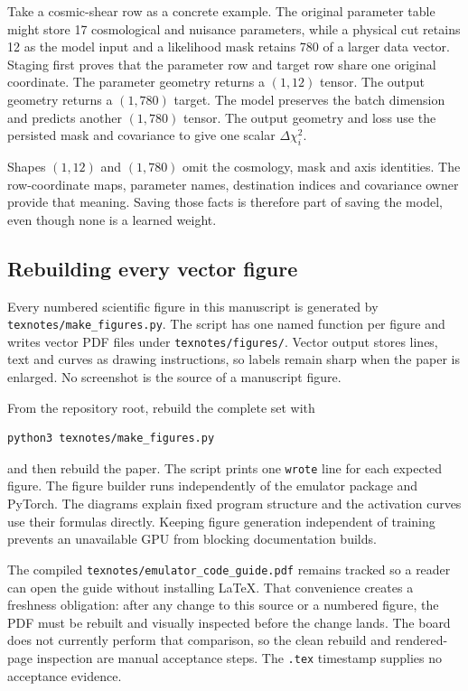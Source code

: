 \documentclass[10pt,aps,prd,twocolumn,nofootinbib]{revtex4-2}
\newcommand{\code}[1]{\texttt{#1}}
\begin{document}
Take a cosmic-shear row as a concrete example.  The original parameter table
might store 17 cosmological and nuisance parameters, while a physical cut
retains 12 as the model input and a likelihood mask retains 780 of a larger
data vector.  Staging first proves that the parameter row and target row share
one original coordinate.  The parameter geometry returns a $(1,12)$ tensor.
The output geometry returns a $(1,780)$ target.  The model preserves the batch
dimension and predicts another $(1,780)$ tensor.  The output geometry and
loss use the persisted mask and covariance to give one scalar
$\Delta\chi_i^2$.

Shapes $(1,12)$ and $(1,780)$ omit the cosmology, mask and axis identities.
The row-coordinate maps, parameter names, destination indices and covariance
owner provide that meaning.  Saving those facts is therefore part of saving
the model, even though none is a learned weight.

\subsection{Rebuilding every vector figure}

Every numbered scientific figure in this manuscript is generated by
\code{texnotes/make\_figures.py}.  The script has one named function per
figure and writes vector PDF files under \code{texnotes/figures/}.  Vector
output stores lines, text and curves as drawing instructions, so labels
remain sharp when the paper is enlarged.  No screenshot is the source of a
manuscript figure.

From the repository root, rebuild the complete set with
\begin{verbatim}
python3 texnotes/make_figures.py
\end{verbatim}
and then rebuild the paper.  The script prints one \code{wrote} line for each
expected figure.  The figure builder runs independently of the emulator
package and PyTorch.  The diagrams explain fixed program structure and the activation curves use
their formulas directly.  Keeping figure generation independent of training
prevents an unavailable GPU from blocking documentation builds.

The compiled \code{texnotes/emulator\_code\_guide.pdf} remains tracked so a
reader can open the guide without installing LaTeX.  That convenience creates
a freshness obligation: after any change to this source or a numbered figure,
the PDF must be rebuilt and visually inspected before the change lands.  The
board does not currently perform that comparison, so the clean rebuild and
rendered-page inspection are manual acceptance steps.  The \code{.tex}
timestamp supplies no acceptance evidence.
\end{document}

